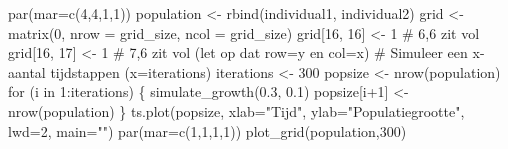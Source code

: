 \documentclass[
  a4paper,
]{scrbook}
\newenvironment{Shaded}{\begin{snugshade}}{\end{snugshade}}
\newcommand{\AttributeTok}[1]{\textcolor[rgb]{0.40,0.45,0.13}{#1}}
\newcommand{\CommentTok}[1]{\textcolor[rgb]{0.37,0.37,0.37}{#1}}
\newcommand{\ControlFlowTok}[1]{\textcolor[rgb]{0.00,0.23,0.31}{#1}}
\newcommand{\DecValTok}[1]{\textcolor[rgb]{0.68,0.00,0.00}{#1}}
\newcommand{\FloatTok}[1]{\textcolor[rgb]{0.68,0.00,0.00}{#1}}
\newcommand{\FunctionTok}[1]{\textcolor[rgb]{0.28,0.35,0.67}{#1}}
\newcommand{\NormalTok}[1]{\textcolor[rgb]{0.00,0.23,0.31}{#1}}
\newcommand{\OtherTok}[1]{\textcolor[rgb]{0.00,0.23,0.31}{#1}}
\newcommand{\SpecialCharTok}[1]{\textcolor[rgb]{0.37,0.37,0.37}{#1}}
\newcommand{\StringTok}[1]{\textcolor[rgb]{0.13,0.47,0.30}{#1}}
\theoremstyle{definition}
\theoremstyle{remark}
\begin{document}
\begin{Shaded}
\begin{Highlighting}[]
\FunctionTok{par}\NormalTok{(}\AttributeTok{mar=}\FunctionTok{c}\NormalTok{(}\DecValTok{4}\NormalTok{,}\DecValTok{4}\NormalTok{,}\DecValTok{1}\NormalTok{,}\DecValTok{1}\NormalTok{))}
\NormalTok{population }\OtherTok{\textless{}{-}} \FunctionTok{rbind}\NormalTok{(individual1, individual2)}
\NormalTok{grid }\OtherTok{\textless{}{-}} \FunctionTok{matrix}\NormalTok{(}\DecValTok{0}\NormalTok{, }\AttributeTok{nrow =}\NormalTok{ grid\_size, }\AttributeTok{ncol =}\NormalTok{ grid\_size)}
\NormalTok{grid[}\DecValTok{16}\NormalTok{, }\DecValTok{16}\NormalTok{] }\OtherTok{\textless{}{-}} \DecValTok{1} \CommentTok{\# 6,6 zit vol}
\NormalTok{grid[}\DecValTok{16}\NormalTok{, }\DecValTok{17}\NormalTok{] }\OtherTok{\textless{}{-}} \DecValTok{1} \CommentTok{\# 7,6 zit vol (let op dat row=y en col=x)}
\CommentTok{\# Simuleer een x{-}aantal tijdstappen (x=iterations)}
\NormalTok{iterations }\OtherTok{\textless{}{-}} \DecValTok{300}
\NormalTok{popsize }\OtherTok{\textless{}{-}} \FunctionTok{nrow}\NormalTok{(population)}
\ControlFlowTok{for}\NormalTok{ (i }\ControlFlowTok{in} \DecValTok{1}\SpecialCharTok{:}\NormalTok{iterations) \{}
  \FunctionTok{simulate\_growth}\NormalTok{(}\FloatTok{0.3}\NormalTok{, }\FloatTok{0.1}\NormalTok{)}
\NormalTok{  popsize[i}\SpecialCharTok{+}\DecValTok{1}\NormalTok{] }\OtherTok{\textless{}{-}} \FunctionTok{nrow}\NormalTok{(population)}
\NormalTok{\}}
\FunctionTok{ts.plot}\NormalTok{(popsize, }\AttributeTok{xlab=}\StringTok{"Tijd"}\NormalTok{, }\AttributeTok{ylab=}\StringTok{"Populatiegrootte"}\NormalTok{, }\AttributeTok{lwd=}\DecValTok{2}\NormalTok{, }\AttributeTok{main=}\StringTok{""}\NormalTok{)}
\FunctionTok{par}\NormalTok{(}\AttributeTok{mar=}\FunctionTok{c}\NormalTok{(}\DecValTok{1}\NormalTok{,}\DecValTok{1}\NormalTok{,}\DecValTok{1}\NormalTok{,}\DecValTok{1}\NormalTok{))}
\FunctionTok{plot\_grid}\NormalTok{(population,}\DecValTok{300}\NormalTok{)}


\end{Highlighting}
\end{Shaded}
\end{document}
